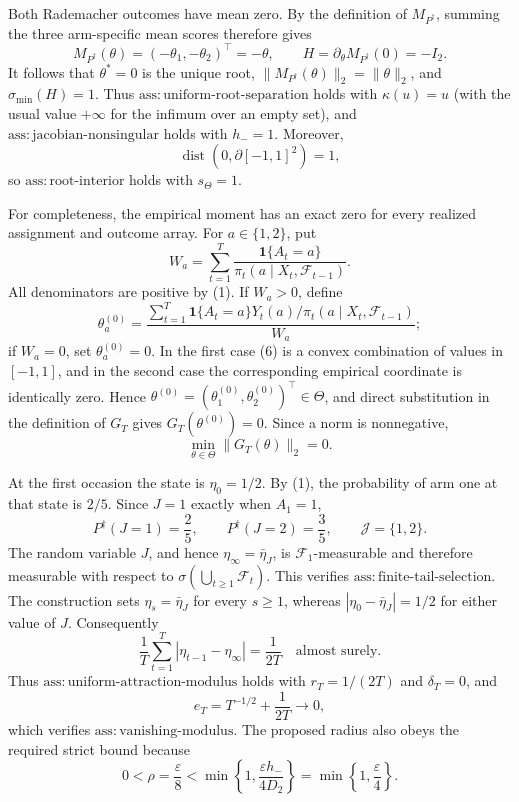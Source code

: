 Both Rademacher outcomes have mean zero. By the definition of \(M_{P^{\dagger}}\), summing the three arm-specific mean scores therefore gives
\[
 M_{P^{\dagger}}(\theta)=(-\theta_1,-\theta_2)^\top=-\theta,
 \qquad H=\partial_\theta M_{P^{\dagger}}(0)=-I_2.
 \tag{4}
\]
It follows that \(\theta^*=0\) is the unique root, \(\|M_{P^{\dagger}}(\theta)\|_2=\|\theta\|_2\), and \(\sigma_{\min}(H)=1\). Thus \(\mathrm{ass:uniform\text{-}root\text{-}separation}\) holds with \(\kappa(u)=u\) (with the usual value \(+\infty\) for the infimum over an empty set), and \(\mathrm{ass:jacobian\text{-}nonsingular}\) holds with \(h_-=1\). Moreover,
\[
 \operatorname{dist}(0,\partial[-1,1]^2)=1,
 \tag{5}
\]
so \(\mathrm{ass:root\text{-}interior}\) holds with \(s_\Theta=1\).

For completeness, the empirical moment has an exact zero for every realized assignment and outcome array. For \(a\in\{1,2\}\), put
\[
 W_a=\sum_{t=1}^T\frac{\mathbf 1\{A_t=a\}}{\pi_t(a\mid X_t,\mathcal F_{t-1})}.
\]
All denominators are positive by (1). If \(W_a>0\), define
\[
 \theta_a^{(0)}=
 \frac{\displaystyle\sum_{t=1}^T
 \mathbf 1\{A_t=a\}Y_t(a)/\pi_t(a\mid X_t,\mathcal F_{t-1})}{W_a};
 \tag{6}
\]
if \(W_a=0\), set \(\theta_a^{(0)}=0\). In the first case (6) is a convex combination of values in \([-1,1]\), and in the second case the corresponding empirical coordinate is identically zero. Hence \(\theta^{(0)}=(\theta_1^{(0)},\theta_2^{(0)})^\top\in\Theta\), and direct substitution in the definition of \(G_T\) gives \(G_T(\theta^{(0)})=0\). Since a norm is nonnegative,
\[
 \min_{\theta\in\Theta}\|G_T(\theta)\|_2=0.
 \tag{7}
\]

At the first occasion the state is \(\eta_0=1/2\). By (1), the probability of arm one at that state is \(2/5\). Since \(J=1\) exactly when \(A_1=1\),
\[
 P^{\dagger}(J=1)=\frac25,
 \qquad
 P^{\dagger}(J=2)=\frac35,
 \qquad \mathcal J=\{1,2\}.
 \tag{8}
\]
The random variable \(J\), and hence \(\eta_\infty=\bar\eta_J\), is \(\mathcal F_1\)-measurable and therefore measurable with respect to \(\sigma(\bigcup_{t\ge1}\mathcal F_t)\). This verifies \(\mathrm{ass:finite\text{-}tail\text{-}selection}\). The construction sets \(\eta_s=\bar\eta_J\) for every \(s\ge1\), whereas \(|\eta_0-\bar\eta_J|=1/2\) for either value of \(J\). Consequently
\[
 \frac1T\sum_{t=1}^T|\eta_{t-1}-\eta_\infty|=\frac1{2T}
 \quad\text{almost surely}.
 \tag{9}
\]
Thus \(\mathrm{ass:uniform\text{-}attraction\text{-}modulus}\) holds with \(r_T=1/(2T)\) and \(\delta_T=0\), and
\[
 e_T=T^{-1/2}+\frac1{2T}\longrightarrow0,
 \tag{10}
\]
which verifies \(\mathrm{ass:vanishing\text{-}modulus}\). The proposed radius also obeys the required strict bound because
\[
 0<\rho=\frac{\varepsilon}{8}
 <\min\left\{1,\frac{\varepsilon h_-}{4D_2}\right\}
 =\min\left\{1,\frac{\varepsilon}{4}\right\}.
 \tag{11}
\]

